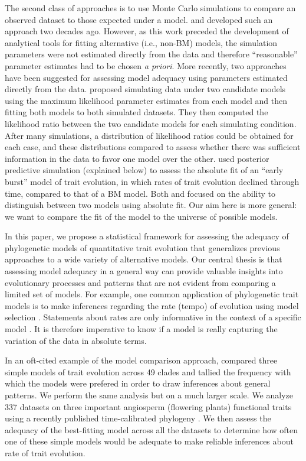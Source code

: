 The second class of approaches is to use Monte Carlo simulations to compare an observed dataset to those expected under a model. \citet{Garland1993} and \citet{Diaz1996} developed such an approach two decades ago. However, as this work preceded the development of analytical tools for fitting alternative (i.e., non-BM) models, the simulation parameters were not estimated directly from the data and therefore ``reasonable'' parameter estimates had to be chosen \emph{a priori}. More recently, two approaches have been suggested for assessing model adequacy using parameters estimated directly from the data. \citet{Boettiger2012} proposed simulating data under two candidate models using the maximum likelihood parameter estimates from each model and then fitting both models to both simulated datasets. They then computed the likelihood ratio between the two candidate models for each simulating condition. After many simulations, a distribution of likelihood ratios could be obtained for each case, and these distributions compared to assess whether there was sufficient information in the data to favor one model over the other. 
\citet{SlaterPennell} used posterior predictive simulation (explained below) to assess the absolute fit of an ``early burst'' model of trait evolution, in which rates of trait evolution declined through time, compared to that of a BM model. Both \citet{Boettiger2012} and \citet{SlaterPennell} focused on the ability to distinguish between two models using absolute fit. Our aim here is more general: we want to compare the fit of the model to the universe of possible models. 

In this paper, we propose a statistical framework for assessing the adequacy of phylogenetic models of quantitative trait evolution that generalizes previous approaches to a wide variety of alternative models. Our central thesis is that assessing model adequacy in a general way can provide valuable insights into evolutionary processes and patterns that are not evident from comparing a limited set of models. For example, one common application of phylogenetic trait models is to make inferences regarding the rate (tempo) of evolution using model selection \citep[e.g.,][]{Mooers1999, Harmon2010, Hunt2012, SlaterMEE}. Statements about rates are only informative in the context of a specific model \citep{Hunt2012}. It is therefore imperative to know if a model is really capturing the variation of the data in absolute terms. 

In an oft-cited example of the model comparison approach, \citet{Harmon2010} compared three simple models of trait evolution across 49 clades and tallied the frequency with which the models were prefered in order to draw inferences about general patterns. We perform the same analysis but on a much larger scale. We analyze 337 datasets on three important angiosperm (flowering plants) functional traits using a recently published time-calibrated phylogeny \citep{Zanne2013}. We then assess the adequacy of the best-fitting model across all the datasets to determine how often one of these simple models would be adequate to make reliable inferences about rate of trait evolution.
 
